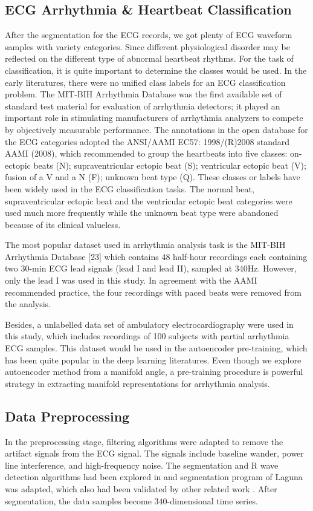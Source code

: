 \documentclass[journal]{IEEEtran}
\begin{document}
\subsection{ECG Arrhythmia \& Heartbeat Classification}

After the segmentation for the ECG records, we got plenty of ECG waveform samples with variety categories. 
Since different physiological disorder may be reflected on the different type of abnormal heartbeat rhythms. 
For the task of classification, it is quite important to determine the classes would be used. 
In the early literatures, there were no unified class labels for an ECG classification problem. 
The MIT-BIH Arrhythmia Database was the first available set of standard test material for evaluation of arrhythmia detectors; it played an important role in stimulating manufacturers of arrhythmia analyzers to compete by objectively measurable performance. 
The annotations in the open database for the ECG categories adopted the ANSI/AAMI EC57: 1998/(R)2008 standard AAMI (2008), which recommended to group the heartbeats into five classes: on-ectopic beats (N); supraventricular ectopic beat (S); ventricular ectopic beat (V); fusion of a V and a N (F); unknown beat type (Q). These classes or labels have been widely used in the ECG classification tasks. 
The normal beat, supraventricular ectopic beat and the ventricular ectopic beat categories were used much more frequently while the unknown beat type were abandoned because of its clinical valueless.

The most popular dataset used in arrhythmia analysis task is the MIT-BIH Arrhythmia Database [23] which contains 48 half-hour recordings each containing two 30-min ECG lead signals (lead I and lead II), sampled at 340Hz. 
However, only the lead I was used in this study. 
In agreement with the AAMI recommended practice, the four recordings with paced beats were removed from the analysis. 

Besides, a unlabelled data set of ambulatory electrocardiography were used in this study, which includes recordings of 100 subjects with partial arrhythmia ECG samples. 
This dataset would be used in the autoencoder pre-training, which has been quite popular in the deep learning literatures.
Even though we explore autoencoder method from a manifold angle, a pre-training procedure is powerful strategy in extracting manifold representations for arrhythmia analysis.




\subsection{Data Preprocessing}
In the preprocessing stage, filtering algorithms were adapted to remove the artifact signals from the ECG signal. 
The signals include baseline wander, power line interference, and high-frequency noise. 
The segmentation and R wave detection algorithms had been explored in \cite{afonso} and segmentation program of Laguna \cite{sornmo2006electrocardiogram} was adapted, which also had been validated by other related work \cite{chaza}. 
After segmentation, the data samples become $340$-dimensional time series.
\end{document}
